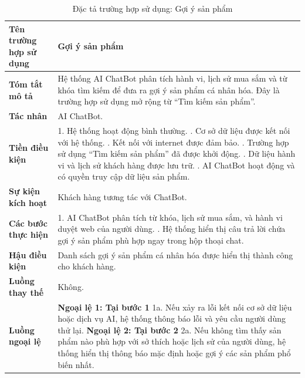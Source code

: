 {
\begin{longtable}{|>{\bfseries}p{4cm}|p{11.5cm}|}
\caption{Đặc tả trường hợp sử dụng: Gợi ý sản phẩm}
\label{tab:uc-product-suggestion} \\
\hline
\textbf{Tên trường hợp sử dụng} & Gợi ý sản phẩm \\
\hline
\textbf{Tóm tắt mô tả} & Hệ thống AI ChatBot phân tích hành vi, lịch sử mua sắm và từ khóa tìm kiếm để đưa ra gợi ý sản phẩm cá nhân hóa. Đây là trường hợp sử dụng mở rộng từ “Tìm kiếm sản phẩm”. \\
\hline
\textbf{Tác nhân} & AI ChatBot. \\
\hline
\textbf{Tiền điều kiện} & 1. Hệ thống hoạt động bình thường. \newline
2. Cơ sở dữ liệu được kết nối với hệ thống. \newline
3. Kết nối với internet được đảm bảo. \newline
4. Trường hợp sử dụng “Tìm kiếm sản phẩm” đã được khởi động. \newline
5. Dữ liệu hành vi và lịch sử khách hàng được lưu trữ. \newline
6. AI ChatBot hoạt động và có quyền truy cập dữ liệu sản phẩm. \\
\hline
\textbf{Sự kiện kích hoạt} & Khách hàng tương tác với ChatBot. \\
\hline
\textbf{Các bước thực hiện} & 1. AI ChatBot phân tích từ khóa, lịch sử mua sắm, và hành vi duyệt web của người dùng. \newline
2. Hệ thống hiển thị câu trả lời chứa gợi ý sản phẩm phù hợp ngay trong hộp thoại chat. \\
\hline
\textbf{Hậu điều kiện} & Danh sách gợi ý sản phẩm cá nhân hóa được hiển thị thành công cho khách hàng. \\
\hline
\textbf{Luồng thay thế} & Không. \\
\hline
\textbf{Luồng ngoại lệ} & \textbf{Ngoại lệ 1: Tại bước 1} \newline
1a. Nếu xảy ra lỗi kết nối cơ sở dữ liệu hoặc dịch vụ AI, hệ thống thông báo lỗi và yêu cầu người dùng thử lại. \newline
\textbf{Ngoại lệ 2: Tại bước 2} \newline
2a. Nếu không tìm thấy sản phẩm nào phù hợp với sở thích hoặc lịch sử của người dùng, hệ thống hiển thị thông báo mặc định hoặc gợi ý các sản phẩm phổ biến nhất. \\
\hline
\end{longtable}

}
